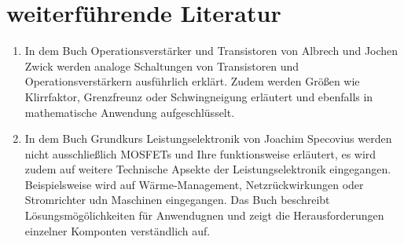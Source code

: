 \section{weiterführende Literatur} 
\begin{center}
	\begin{enumerate}
		\item  In dem Buch \glqq Operationsverstärker und Transistoren \grqq \space von Albrech und Jochen Zwick  \cite{Zwick:2022} werden analoge Schaltungen von Transistoren und Operationsverstärkern ausführlich erklärt. Zudem werden Größen wie Klirrfaktor, Grenzfreunz oder Schwingneigung erläutert und ebenfalls in mathematische Anwendung aufgeschlüsselt. 
		\item  In dem Buch \glqq  Grundkurs
		Leistungselektronik   \grqq \space von Joachim Specovius \cite{Specovius:2017} werden nicht ausschließlich MOSFETs und Ihre funktionsweise erläutert, es wird zudem auf weitere Technische Apsekte der Leistungselektronik eingegangen. Beispielsweise wird auf  Wärme-Management, Netzrückwirkungen oder Stromrichter udn Maschinen eingegangen. Das Buch beschreibt Lösungsmögölichkeiten für Anwendugnen und zeigt die Herausforderungen einzelner Komponten verständlich auf. 
			\end{enumerate}
\end{center}
